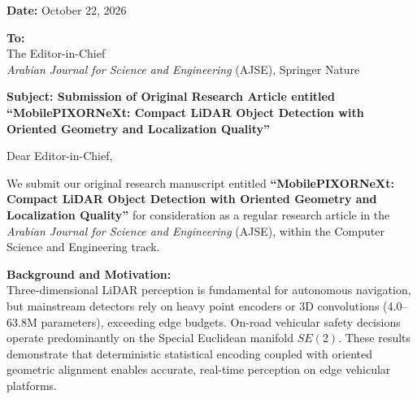 \documentclass[10.5pt,a4paper]{article}
\begin{document}
\begin{flushright}\small
    \textbf{Date:} October 22, 2026
\end{flushright}

\vspace{-0.5em}
\noindent
\textbf{To:}\\
The Editor-in-Chief\\
\textit{Arabian Journal for Science and Engineering} (AJSE), Springer Nature

\vspace{0.6em}
\noindent
\textbf{Subject: Submission of Original Research Article entitled ``MobilePIXORNeXt: Compact LiDAR Object Detection with Oriented Geometry and Localization Quality''}

\vspace{0.6em}
\noindent
Dear Editor-in-Chief,

\vspace{0.4em}\noindent
We submit our original research manuscript entitled \textbf{``MobilePIXORNeXt: Compact LiDAR Object Detection with Oriented Geometry and Localization Quality''} for consideration as a regular research article in the \textit{Arabian Journal for Science and Engineering} (AJSE), within the Computer Science and Engineering track.

\vspace{0.5em}\noindent
\textbf{Background and Motivation:}\\
Three-dimensional LiDAR perception is fundamental for autonomous navigation, but mainstream detectors rely on heavy point encoders or 3D convolutions (4.0--63.8M parameters), exceeding edge budgets. On-road vehicular safety decisions operate predominantly on the Special Euclidean manifold $SE(2)$. These results demonstrate that deterministic statistical encoding coupled with oriented geometric alignment enables accurate, real-time perception on edge vehicular platforms.
\end{document}
